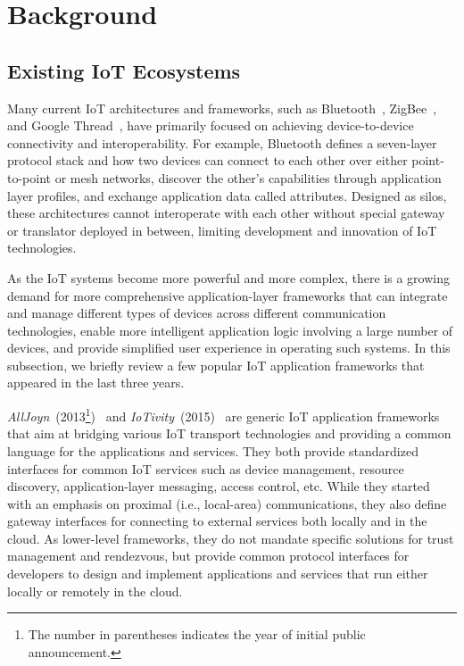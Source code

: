 \section{Background}
\label{sec:background}

\subsection{Existing IoT Ecosystems}
\label{sec:iot-ecosystems}

Many current IoT architectures and frameworks, such as Bluetooth~\cite{bluetooth}, ZigBee~\cite{zigbee}, and Google Thread~\cite{thread}, have primarily focused on achieving device-to-device connectivity and interoperability.
For example, Bluetooth defines a seven-layer protocol stack and how two devices can connect to each other over either point-to-point or mesh networks, discover the other's capabilities through application layer profiles, and exchange application data called attributes.
Designed as silos, these architectures cannot interoperate with each other without special gateway or translator deployed in between, limiting development and innovation of IoT technologies.

As the IoT systems become more powerful and more complex, there is a growing demand for more comprehensive application-layer frameworks that can integrate and manage different types of devices across different communication technologies, enable more intelligent application logic involving a large number of devices, and provide simplified user experience in operating such systems.
In this subsection, we briefly review a few popular IoT application frameworks that appeared in the last three years.

\emph{AllJoyn}~(2013\footnote{The number in parentheses indicates the year of initial public announcement.})~\cite{alljoyn} and \emph{IoTivity}~(2015)~\cite{iotivity} are generic IoT application frameworks that aim at bridging various IoT transport technologies and providing a common language for the applications and services.
They both provide standardized interfaces for common IoT services such as device management, resource discovery, application-layer messaging, access control, etc.
While they started with an emphasis on proximal (i.e., local-area) communications, they also define gateway interfaces for connecting to external services both locally and in the cloud.
As lower-level frameworks, they do not mandate specific solutions for trust management and rendezvous, but provide common protocol interfaces for developers to design and implement applications and services that run either locally or remotely in the cloud.

